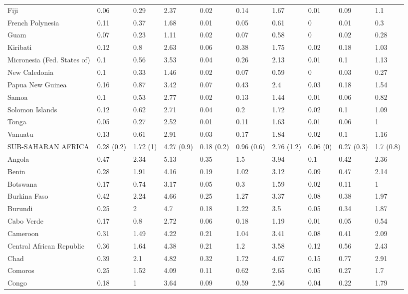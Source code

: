\begin{longtable}[t]{llllllllll}
Fiji & 0.06 & 0.29 & 2.37 & 0.02 & 0.14 & 1.67 & 0.01 & 0.09 & 1.1\\
French Polynesia & 0.11 & 0.37 & 1.68 & 0.01 & 0.05 & 0.61 & 0 & 0.01 & 0.3\\
Guam & 0.07 & 0.23 & 1.11 & 0.02 & 0.07 & 0.58 & 0 & 0.02 & 0.28\\
Kiribati & 0.12 & 0.8 & 2.63 & 0.06 & 0.38 & 1.75 & 0.02 & 0.18 & 1.03\\
Micronesia (Fed. States of) & 0.1 & 0.56 & 3.53 & 0.04 & 0.26 & 2.13 & 0.01 & 0.1 & 1.13\\
New Caledonia & 0.1 & 0.33 & 1.46 & 0.02 & 0.07 & 0.59 & 0 & 0.03 & 0.27\\
Papua New Guinea & 0.16 & 0.87 & 3.42 & 0.07 & 0.43 & 2.4 & 0.03 & 0.18 & 1.54\\
Samoa & 0.1 & 0.53 & 2.77 & 0.02 & 0.13 & 1.44 & 0.01 & 0.06 & 0.82\\
Solomon Islands & 0.12 & 0.62 & 2.71 & 0.04 & 0.2 & 1.72 & 0.02 & 0.1 & 1.09\\
Tonga & 0.05 & 0.27 & 2.52 & 0.01 & 0.11 & 1.63 & 0.01 & 0.06 & 1\\
Vanuatu & 0.13 & 0.61 & 2.91 & 0.03 & 0.17 & 1.84 & 0.02 & 0.1 & 1.16\\
SUB-SAHARAN AFRICA & 0.28 (0.2) & 1.72 (1) & 4.27 (0.9) & 0.18 (0.2) & 0.96 (0.6) & 2.76 (1.2) & 0.06 (0) & 0.27 (0.3) & 1.7 (0.8)\\
Angola & 0.47 & 2.34 & 5.13 & 0.35 & 1.5 & 3.94 & 0.1 & 0.42 & 2.36\\
Benin & 0.28 & 1.91 & 4.16 & 0.19 & 1.02 & 3.12 & 0.09 & 0.47 & 2.14\\
Botswana & 0.17 & 0.74 & 3.17 & 0.05 & 0.3 & 1.59 & 0.02 & 0.11 & 1\\
Burkina Faso & 0.42 & 2.24 & 4.66 & 0.25 & 1.27 & 3.37 & 0.08 & 0.38 & 1.97\\
Burundi & 0.25 & 2 & 4.7 & 0.18 & 1.22 & 3.5 & 0.05 & 0.34 & 1.87\\
Cabo Verde & 0.17 & 0.8 & 2.72 & 0.06 & 0.18 & 1.19 & 0.01 & 0.05 & 0.54\\
Cameroon & 0.31 & 1.49 & 4.22 & 0.21 & 1.04 & 3.41 & 0.08 & 0.41 & 2.09\\
Central African Republic & 0.36 & 1.64 & 4.38 & 0.21 & 1.2 & 3.58 & 0.12 & 0.56 & 2.43\\
Chad & 0.39 & 2.1 & 4.82 & 0.32 & 1.72 & 4.67 & 0.15 & 0.77 & 2.91\\
Comoros & 0.25 & 1.52 & 4.09 & 0.11 & 0.62 & 2.65 & 0.05 & 0.27 & 1.7\\
Congo & 0.18 & 1 & 3.64 & 0.09 & 0.59 & 2.56 & 0.04 & 0.22 & 1.79\\

\end{longtable}

